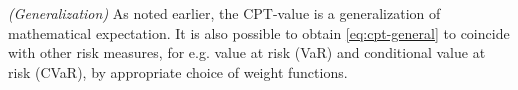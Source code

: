 %

\begin{remark}\textit{(Generalization)}
As noted earlier, the CPT-value is a generalization of mathematical expectation. 
It is also possible to obtain \eqref{eq:cpt-general} to coincide with other risk measures, for e.g. value at risk (VaR) and conditional value at risk (CVaR), by appropriate choice of weight functions.
\end{remark}

